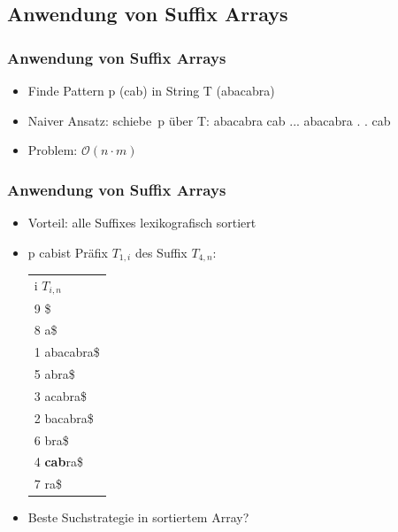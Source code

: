\documentclass{beamer}
\begin{document}
\subsection{Anwendung von Suffix Arrays}
\begin{frame}
\frametitle{Anwendung von Suffix Arrays}
\begin{itemize}
\item Finde Pattern p (\glqq cab\grqq) in String T (\glqq abacabra\grqq)
\item Naiver Ansatz: \glqq schiebe\grqq\ p über T: \newline
{\ttfamily
abacabra \newline
cab\textrightarrow \newline
...\newline
abacabra \newline
. . cab
}
\item Problem: $\mathcal{O}(n\cdot m)$
\end{itemize}
\end{frame}
\begin{frame}
\frametitle{Anwendung von Suffix Arrays}
\begin{itemize}
\item Vorteil: alle Suffixes lexikografisch sortiert
\item p \glqq cab\grqq ist Präfix $T_{1,i}$ des Suffix $T_{4,n}$: \newline
\begin{tabular}{l}
	i $T_{i,n}$\\
9 \$\\
8 a\$\\
1 abacabra\$\\
5 abra\$\\
3 acabra\$\\
2 bacabra\$\\
6 bra\$\\
4 \color{red}\textbf{cab}\color{black}ra\$\\
7 ra\$\\
	\end{tabular}
\item Beste Suchstrategie in sortiertem Array?
\end{itemize}
\end{frame}
\end{document}

